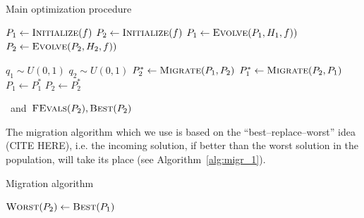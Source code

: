 \documentclass{sig-alternate}
\begin{document}
    \begin{algorithm}
    \caption{Main optimization procedure}
    \label{alg:main_loop}
    \begin{algorithmic}[1]
        \State $P_1 \gets \Call{Initialize}{f}$
        \State $P_2 \gets \Call{Initialize}{f}$
        \Do
            \State $P_1 \gets \Call{Evolve}{P_1, H_1, f)}$
            \State $P_2 \gets \Call{Evolve}{P_2, H_2, f)}$%

            \State $q_1 \sim U(0,1)$
            \State $q_2 \sim U(0,1)$%
                \State $P_2^* \gets \Call{Migrate}{P_1, P_2}$
            \EndIf
                \State $P_1^* \gets \Call{Migrate}{P_2, P_1}$
            \EndIf
            \State $P_1 \gets P_1^*$
            \State $P_2 \gets P_2^*$

            \EndProcedure \mbox{ and }\Return $\Call{FEvals}{P_2}, \Call{Best}{P_2}$
    \end{algorithmic}
    \end{algorithm}
    The migration algorithm which we use is based on the ``best--replace--worst'' idea (CITE HERE), i.e. the incoming solution, if better than the worst solution in the population, will take its place (see Algorithm~\ref{alg:migr_1}).
    \begin{algorithm}
    \caption{Migration algorithm}
    \label{alg:migr_1}
    \begin{algorithmic}[1]
            \State $\Call{Worst}{P_2} \gets \Call{Best}{P_1}$
        \EndIf
    \EndProcedure
    \end{algorithmic}
    \end{algorithm}
\end{document}
